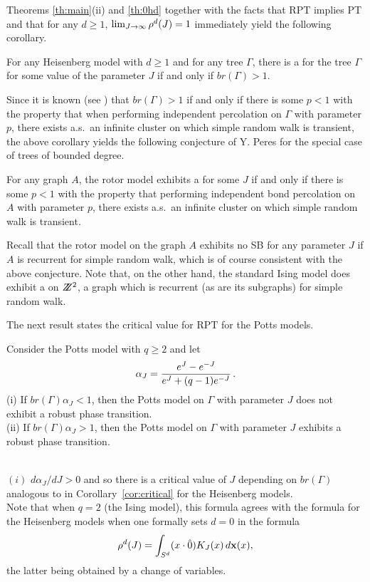 Theorems \ref{th:main}(ii) and \ref{th:0hd} together with the facts that
RPT implies PT and that for any $d\ge 1$,
$\lim_{J\to\infty} \rho^d(J) = 1$ immediately yield the following corollary.

\begin{cor} \label{cor:perestree}
For any Heisenberg model with $d\ge 1$ and for any tree $\Gamma$, 
there is a \pt for the tree $\Gamma$ for some
value of the parameter $J$ if and only if $\textstyle {br} (\Gamma)>1$.
\end{cor}

Since it is known (see \cite{Ly2}) that $\textstyle {br} (\Gamma)>1$
if and only if there is some $p< 1$ with the property that when
performing independent percolation on $\Gamma$ with parameter $p$, there
exists a.s.\ an infinite cluster on which simple random walk is transient, the
above corollary yields the following conjecture of Y. Peres for the
special case of trees of bounded degree.

\begin{conj} \label{conj:peres}
For any graph $A$, the rotor model exhibits a \pt for some $J$ if and only
if there is some $p< 1$ with the property
that performing independent bond percolation on $A$ with parameter $p$, there
exists a.s.\ an infinite cluster on which simple random walk is transient.
\end{conj}

Recall that the rotor model on the graph $A$ exhibits
no SB for any parameter $J$ if $A$ is recurrent for simple random walk,
which is of course consistent with the above conjecture.
Note that, on the other hand, the standard Ising model does exhibit a
\pt on $Z\!\!\!Z^2$, a graph which is recurrent (as are its subgraphs)
for simple random walk.

The next result states the critical value for RPT for the Potts models.

\begin{th} \label{th:potts}
Consider the Potts model with $q \ge 2$ and let
$$\alpha_J = {e^J - e^{-J} \over e^J + (q-1) e^{-J}} \, .$$
(i) If $\textstyle {br} (\Gamma) \alpha_J <1$,
then the Potts model on $\Gamma$ with
parameter $J$ does not exhibit a robust phase transition. \\
(ii) If $\textstyle{br}(\Gamma) \alpha_J >1$, then the 
Potts model on $\Gamma$ with parameter $J$ exhibits a robust phase 
transition.
\end{th}

\\
$(i)$ $d\alpha_J/dJ >0$ and so there is a critical value of $J$ depending
on $\textstyle{br}(\Gamma)$ analogous to in Corollary~\ref{cor:critical}
for the Heisenberg models. \\
Note that when $q=2$ (the Ising model), this formula agrees 
with the formula for the Heisenberg models when one formally sets $d=0$
in the formula 
$$
\rho^d(J)=\int_{S^d} (x \cdot {\hat{0}}) K_J (x) \, d{\bf x}(x),
$$
the latter being obtained by a change of variables.

